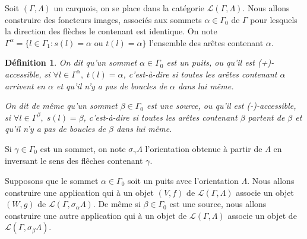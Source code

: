 \documentclass[a4paper,10pt]{article}
\newtheorem{defi}{Définition}[section]
\begin{document}
Soit $(\Gamma,\Lambda)$ un carquois, on se place dans la catégorie $\mathscr{L}(\Gamma,\Lambda)$. Nous allons construire des foncteurs images, associés aux sommets $\alpha \in \Gamma_{0}$ de $\Gamma$ pour lesquels la direction des flèches le contenant est identique. On note $\Gamma^{\alpha}=\{ l\in \Gamma_{1} : s(l)=\alpha\text{ ou }t(l)=\alpha\}$ l'ensemble des arêtes contenant $\alpha$.

\begin{defi}
	On dit qu'un sommet $\alpha \in \Gamma_{0}$ est un puits, ou qu'il est (+)-accessible, si $\forall l \in \Gamma^{\alpha},\; t(l)=\alpha$, c'est-à-dire si toutes les arêtes contenant $\alpha$ arrivent en $\alpha$ et qu'il n'y a pas de boucles de $\alpha$ dans lui même.

On dit de même qu'un sommet $\beta \in \Gamma_{0}$ est une source, ou qu'il est (-)-accessible, si $\forall l \in \Gamma^{\beta},\; s(l)=\beta$, c'est-à-dire si toutes les arêtes contenant $\beta$ partent de $\beta$ et qu'il n'y a pas de boucles de $\beta$ dans lui même.
\end{defi}


Si $\gamma \in \Gamma_0$ est un sommet, on note $\sigma_{\gamma}\Lambda$ l'orientation obtenue à partir de $\Lambda$ en inversant le sens des flêches contenant $\gamma$.

Supposons que le sommet $\alpha \in \Gamma_{0}$ soit un puits avec l'orientation $\Lambda$.  Nous allons construire une application qui à un objet $(V,f)$ de $\mathscr{L}(\Gamma,\Lambda)$ associe un objet $(W,g)$ de $\mathscr{L}(\Gamma,\sigma_{\alpha}\Lambda)$. De même si $\beta \in \Gamma_0$ est une source, nous allons construire une autre application qui à un objet de $\mathscr L(\Gamma,\Lambda)$ associe un objet de $\mathscr L(\Gamma,\sigma_{\beta}\Lambda)$. 
\end{document}
